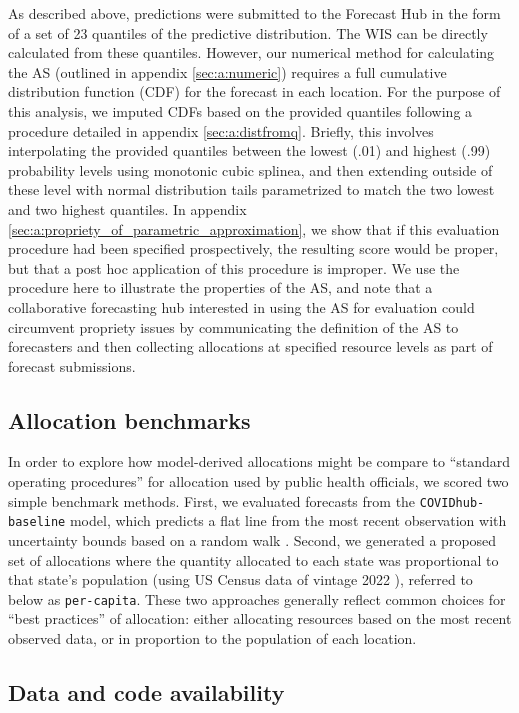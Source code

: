 \documentclass{article}\usepackage[]{graphicx}\usepackage[]{xcolor}
\begin{document}
As described above, predictions were submitted to the Forecast Hub in the form of a set of 23 quantiles of the
predictive distribution. The WIS can be directly calculated from these quantiles. However, our numerical method for calculating 
the AS (outlined in appendix \ref{sec:a:numeric})
requires a full cumulative distribution function (CDF) for the forecast in each location.
For the purpose of this analysis, we imputed CDFs based on the provided quantiles following a procedure detailed in 
appendix \ref{sec:a:distfromq}. Briefly, this involves interpolating the provided quantiles between the lowest (.01) and highest 
(.99) probability levels using monotonic cubic splinea, and then extending outside of these level with normal distribution tails
parametrized to match the two lowest and two highest quantiles. In appendix \ref{sec:a:propriety_of_parametric_approximation}, 
we show that if this evaluation procedure
had been specified prospectively, the resulting score would be proper, \textemdash but that a post hoc application of this
procedure is improper. We use the procedure here to illustrate the properties of the AS, and note that a collaborative
forecasting hub interested in using the AS for evaluation could circumvent propriety issues by communicating the
definition of the AS to forecasters and then collecting allocations at specified resource levels as part of forecast
submissions.

\subsection{Allocation benchmarks}

In order to explore how model-derived allocations might be compare to ``standard operating procedures'' for allocation
used by public health officials, we scored two simple benchmark methods. First, we evaluated forecasts from the
\texttt{COVIDhub-baseline} model, which predicts a flat line from the most recent observation with uncertainty bounds
based on a random walk \citep{cramer_evaluation_2022}. Second, we generated a proposed set of allocations where the
quantity allocated to each state was proportional to that state's population (using US Census data of vintage 2022
\citep{us_census_nst_est2022}), referred to below as \texttt{per-capita}. These two approaches generally reflect common
choices for ``best practices'' of allocation: either allocating resources based on the most recent observed data, or in
proportion to the population of each location. 

\subsection{Data and code availability}
\end{document}
